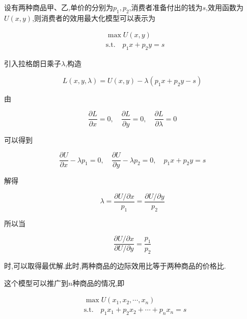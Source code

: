 \documentclass{article}
\begin{document}

设有两种商品甲、乙,单价的分别为$p_1, p_2$,消费者准备付出的钱为$s$,效用函数为$U(x, y)$,则消费者的效用最大化模型可以表示为

\begin{equation}
    \begin{aligned}
        &\max U(x, y) \\
        &\text{s.t.} \quad p_1x + p_2y = s
    \end{aligned}
\end{equation}

引入拉格朗日乘子$\lambda$,构造

\begin{equation}
    L(x, y, \lambda) = U(x, y) - \lambda(p_1x + p_2y - s)
\end{equation}

由

\begin{equation}
        \frac{\partial L}{\partial x} = 0, \quad \frac{\partial L}{\partial y} = 0, \quad \frac{\partial L}{\partial \lambda} = 0
\end{equation}

可以得到

\begin{equation}
        \frac{\partial U}{\partial x} - \lambda p_1 = 0, \quad \frac{\partial U}{\partial y} - \lambda p_2 = 0, \quad p_1x + p_2y = s
\end{equation}

解得

\begin{equation}
    \lambda = \frac{\partial U/\partial x}{p_1} = \frac{\partial U/\partial y}{p_2}
\end{equation}

所以当

\begin{equation}
    \frac{\partial U/ \partial x}{\partial U/ \partial y} = \frac{p_1}{p_2}
\end{equation}

时,可以取得最优解.此时,两种商品的边际效用比等于两种商品的价格比.

这个模型可以推广到$n$种商品的情况,即

\begin{equation}
    \begin{aligned}
        &\max U(x_1, x_2, \cdots, x_n) \\
        &\text{s.t.} \quad p_1x_1 + p_2x_2 + \cdots + p_nx_n = s
    \end{aligned}
\end{equation}
\end{document}
